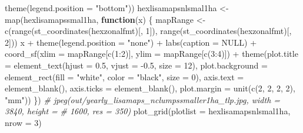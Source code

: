 \documentclass[10pt,landscape,a3paper]{article}
\newenvironment{Shaded}{\begin{snugshade}}{\end{snugshade}}
\newcommand{\AttributeTok}[1]{\textcolor[rgb]{0.77,0.63,0.00}{#1}}
\newcommand{\CommentTok}[1]{\textcolor[rgb]{0.56,0.35,0.01}{\textit{#1}}}
\newcommand{\ConstantTok}[1]{\textcolor[rgb]{0.00,0.00,0.00}{#1}}
\newcommand{\ControlFlowTok}[1]{\textcolor[rgb]{0.13,0.29,0.53}{\textbf{#1}}}
\newcommand{\DecValTok}[1]{\textcolor[rgb]{0.00,0.00,0.81}{#1}}
\newcommand{\FloatTok}[1]{\textcolor[rgb]{0.00,0.00,0.81}{#1}}
\newcommand{\FunctionTok}[1]{\textcolor[rgb]{0.00,0.00,0.00}{#1}}
\newcommand{\NormalTok}[1]{#1}
\newcommand{\OtherTok}[1]{\textcolor[rgb]{0.56,0.35,0.01}{#1}}
\newcommand{\SpecialCharTok}[1]{\textcolor[rgb]{0.00,0.00,0.00}{#1}}
\newcommand{\StringTok}[1]{\textcolor[rgb]{0.31,0.60,0.02}{#1}}
\begin{document}
\begin{Shaded}
\begin{Highlighting}[]
    \FunctionTok{theme}\NormalTok{(}\AttributeTok{legend.position =} \StringTok{"bottom"}\NormalTok{))}
\NormalTok{hexlisamapsnlsmal1ha }\OtherTok{\textless{}{-}} \FunctionTok{map}\NormalTok{(hexlisamapssmal1ha, }\ControlFlowTok{function}\NormalTok{(x) \{}
\NormalTok{    mapRange }\OtherTok{\textless{}{-}} \FunctionTok{c}\NormalTok{(}\FunctionTok{range}\NormalTok{(}\FunctionTok{st\_coordinates}\NormalTok{(hexzonalfmt)[, }\DecValTok{1}\NormalTok{]), }\FunctionTok{range}\NormalTok{(}\FunctionTok{st\_coordinates}\NormalTok{(hexzonalfmt)[,}
        \DecValTok{2}\NormalTok{]))}
\NormalTok{    x }\SpecialCharTok{+} \FunctionTok{theme}\NormalTok{(}\AttributeTok{legend.position =} \StringTok{"none"}\NormalTok{) }\SpecialCharTok{+} \FunctionTok{labs}\NormalTok{(}\AttributeTok{caption =} \ConstantTok{NULL}\NormalTok{) }\SpecialCharTok{+} \FunctionTok{coord\_sf}\NormalTok{(}\AttributeTok{xlim =}\NormalTok{ mapRange[}\FunctionTok{c}\NormalTok{(}\DecValTok{1}\SpecialCharTok{:}\DecValTok{2}\NormalTok{)],}
        \AttributeTok{ylim =}\NormalTok{ mapRange[}\FunctionTok{c}\NormalTok{(}\DecValTok{3}\SpecialCharTok{:}\DecValTok{4}\NormalTok{)]) }\SpecialCharTok{+} \FunctionTok{theme}\NormalTok{(}\AttributeTok{plot.title =} \FunctionTok{element\_text}\NormalTok{(}\AttributeTok{hjust =} \FloatTok{0.5}\NormalTok{, }\AttributeTok{vjust =} \SpecialCharTok{{-}}\FloatTok{0.5}\NormalTok{,}
        \AttributeTok{size =} \DecValTok{12}\NormalTok{), }\AttributeTok{plot.background =} \FunctionTok{element\_rect}\NormalTok{(}\AttributeTok{fill =} \StringTok{"white"}\NormalTok{, }\AttributeTok{color =} \StringTok{"black"}\NormalTok{,}
        \AttributeTok{size =} \DecValTok{0}\NormalTok{), }\AttributeTok{axis.text =} \FunctionTok{element\_blank}\NormalTok{(), }\AttributeTok{axis.ticks =} \FunctionTok{element\_blank}\NormalTok{(), }\AttributeTok{plot.margin =} \FunctionTok{unit}\NormalTok{(}\FunctionTok{c}\NormalTok{(}\DecValTok{2}\NormalTok{,}
        \DecValTok{2}\NormalTok{, }\DecValTok{2}\NormalTok{, }\DecValTok{2}\NormalTok{), }\StringTok{"mm"}\NormalTok{))}
\NormalTok{\})}
\CommentTok{\# jpeg(\textquotesingle{}out/yearly\_lisamaps\_nclumpssmaller1ha\_tlp.jpg\textquotesingle{}, width = 3840, height =}
\CommentTok{\# 1600, res = 350)}
\FunctionTok{plot\_grid}\NormalTok{(}\AttributeTok{plotlist =}\NormalTok{ hexlisamapsnlsmal1ha, }\AttributeTok{nrow =} \DecValTok{3}\NormalTok{)}
\end{Highlighting}
\end{Shaded}
\end{document}
